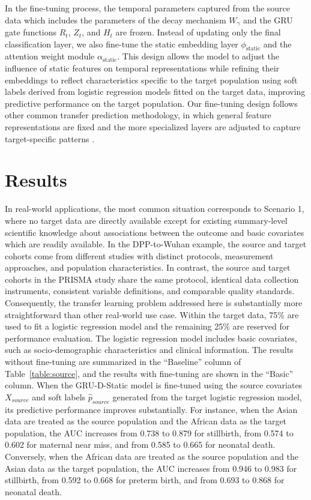 \documentclass[fleqn,10pt]{wlscirep}
\begin{document}
In the fine-tuning process, the temporal parameters captured from the source data which includes the parameters of the decay mechanism $W_\gamma$ and the GRU gate functions $R_t$, $Z_t$, and $H_t$ are frozen. Instead of updating only the final classification layer, we also fine-tune the static embedding layer $\phi_{\text{static}}$ and the attention weight module $\alpha_{\text{static}}$. This design allows the model to adjust the influence of static features on temporal representations while refining their embeddings to reflect characteristics specific to the target population using soft labels derived from logistic regression models fitted on the target data, improving predictive performance on the target population\cite{zhuang2020comprehensive}. Our fine-tuning design follows other common transfer prediction methodology, in which general feature representations are fixed and the more specialized layers are adjusted to capture target-specific patterns \cite{yosinski2014transferable}.

\section*{Results}
In real-world applications, the most common situation corresponds to Scenario 1, where no target data are directly available except for existing summary-level scientific knowledge about associations between the outcome and basic covariates which are readily available. In the DPP-to-Wuhan example, the source and target cohorts come from different studies with distinct protocols, measurement approaches, and population characteristics. In contrast, the source and target cohorts in the PRISMA study share the same protocol, identical data collection instruments, consistent variable definitions, and comparable quality standards. Consequently, the transfer learning problem addressed here is substantially more straightforward than other real-world use case. Within the target data, 75\% are used to fit a logistic regression model and the remaining 25\% are reserved for performance evaluation. The logistic regression model includes basic covariates, such as socio-demographic characteristics and clinical information. The results without fine-tuning are summarized in the ``Baseline'' column of Table~\ref{table:source}, and the results with fine-tuning are shown in the ``Basic'' column. When the GRU-D-Static model is fine-tuned using the source covariates $X_{source}$ and soft labels $\hat{p}_{source}$ generated from the target logistic regression model, its predictive performance improves substantially. For instance, when the Asian data are treated as the source population and the African data as the target population, the AUC increases from 0.738 to 0.879 for stillbirth, from 0.574 to 0.602 for maternal near miss, and from 0.585 to 0.665 for neonatal death. Conversely, when the African data are treated as the source population and the Asian data as the target population, the AUC increases from 0.946 to 0.983 for stillbirth, from 0.592 to 0.668 for preterm birth, and from 0.693 to 0.868 for neonatal death.
\end{document}

